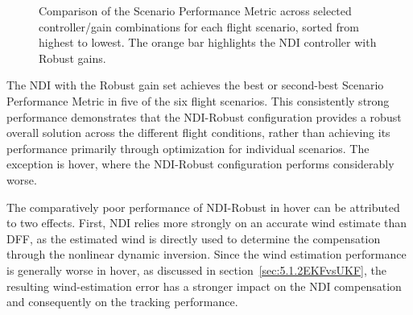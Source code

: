 \begin{figure}[htbp]
	\begin{subfigure}[t]{0.48\linewidth}
		\centering
	\end{subfigure}
	\hfill
	\begin{subfigure}[t]{0.48\linewidth}
		\centering
	\end{subfigure}
	
	\caption{Comparison of the Scenario Performance Metric across selected controller/gain combinations for each flight scenario, sorted from highest to lowest. The orange bar highlights the NDI controller with Robust gains.}
	\label{fig:Compensation_Scenario_Performance_Metric}
\end{figure}

The NDI with the Robust gain set achieves the best or second-best Scenario Performance Metric in five of the six flight scenarios. This consistently strong performance demonstrates that the NDI-Robust configuration provides a robust overall solution across the different flight conditions, rather than achieving its performance primarily through optimization for individual scenarios. The exception is hover, where the NDI-Robust configuration performs considerably worse.

The comparatively poor performance of NDI-Robust in hover can be attributed to two effects. First, NDI relies more strongly on an accurate wind estimate than DFF, as the estimated wind is directly used to determine the compensation through the nonlinear dynamic inversion. Since the wind estimation performance is generally worse in hover, as discussed in section~\ref{sec:5.1.2EKFvsUKF}, the resulting wind-estimation error has a stronger impact on the NDI compensation and consequently on the tracking performance.

